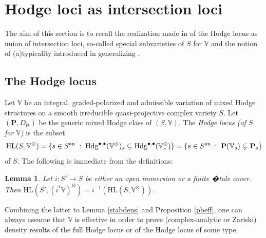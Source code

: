 \documentclass[10pt]{article}
\numberwithin{equation}{subsection}
\theoremstyle{plain}
\newtheorem{lemma}[theorem]{Lemma}
\theoremstyle{definition}
\theoremstyle{remark}
\newcommand{\Q}{\mathbb Q}
\newcommand{\V}{\mathbb V}
\newcommand{\pp}{\mathbf P}
\newcommand{\M}{\mathbf M}
\newcommand{\HL}{\mathrm{HL}(S, \V^\otimes)}
\newcommand{\HLM}{\mathrm{HL}(S, \V^\otimes, \M)}
\newcommand{\bul}{\bullet}
\newcommand{\an}{\mathrm{an}}
\newcommand{\hod}{\mathrm{Hdg}}
\begin{document}
\section{Hodge loci as intersection loci}\label{sect4}
The aim of this section is to recall the realization made in \cite{klingler_atyp} of the Hodge locus as union of intersection loci, so-called special subvarieties of $S$ for $\V$ and the notion of (a)typicality introduced in \cite{bu} generalizing \cite{bku}.
\subsection{The Hodge locus}
Let $\V$ be an integral, graded-polarized and admissible variation of mixed Hodge structures on a smooth irreducible quasi-projective complex variety $S$. Let $(\pp, D_\pp)$ be the generic mixed Hodge class of $(S, \V)$. The \textit{Hodge locus (of $S$ for $\V$)} is the subset 
\[\HL = \{s \in S^\an \hspace{0.1cm} : \hspace{0.1cm} \hod^{\bul,\bul}(\V^\otimes)_s \subsetneq \hod^{\bul,\bul}(\V_s^\otimes)\} = \{s \in S^\an \hspace{0.1cm} : \hspace{0.1cm}\pp(\V_s) \subsetneq \pp_s\} \]
of $S$. 
%
The following is immediate from the definitions:
\begin{lemma}\label{hlpb}
Let $i : S' \rightarrow S$ be either an open immersion or a finite �tale cover. Then $\mathrm{HL}(S', (i^\ast \V)^\otimes) = i^{-1}(\HL)$.
\end{lemma}
Combining the latter to Lemma \ref{stabdens} and Proposition \ref{pbeff}, one can always assume that $\V$ is effective in order to prove (complex-analytic or Zariski) density results of the full Hodge locus or of the Hodge locus of some type.
\end{document}
